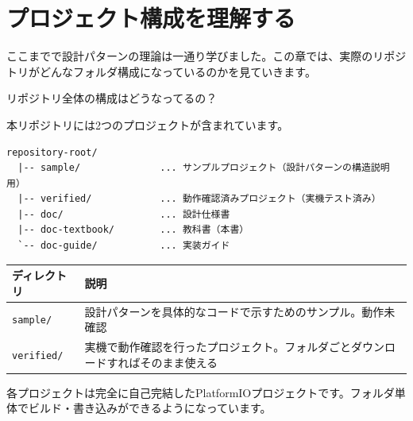 \section{プロジェクト構成を理解する}

ここまでで設計パターンの理論は一通り学びました。この章では、実際のリポジトリがどんなフォルダ構成になっているのかを見ていきます。

\begin{qabox}{リポジトリ全体の構成はどうなってるの？}

本リポジトリには2つのプロジェクトが含まれています。

\begin{lstlisting}[language={},keywordstyle={},commentstyle={},stringstyle={},numbers=none,frame=none,backgroundcolor=\color{lightgray},xleftmargin=5pt,framexleftmargin=5pt]
repository-root/
  |-- sample/              ... サンプルプロジェクト（設計パターンの構造説明用）
  |-- verified/            ... 動作確認済みプロジェクト（実機テスト済み）
  |-- doc/                 ... 設計仕様書
  |-- doc-textbook/        ... 教科書（本書）
  `-- doc-guide/           ... 実装ガイド
\end{lstlisting}

\vspace{2mm}
\begin{tabularx}{\textwidth}{l X}
\toprule
\textbf{ディレクトリ} & \textbf{説明} \\
\midrule
\texttt{sample/} & 設計パターンを具体的なコードで示すためのサンプル。動作未確認 \\
\texttt{verified/} & 実機で動作確認を行ったプロジェクト。フォルダごとダウンロードすればそのまま使える \\
\bottomrule
\end{tabularx}

\vspace{2mm}
各プロジェクトは完全に自己完結したPlatformIOプロジェクトです。フォルダ単体でビルド・書き込みができるようになっています。

\end{qabox}

